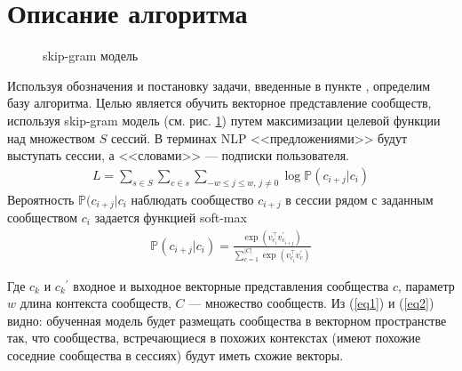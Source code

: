\documentclass[times,specification,annotation]{itmo-student-thesis}
\begin{document}
\section{Описание алгоритма}\label{sec:algo}

\begin{figure}[!h]
\caption{skip-gram модель}\label{fig-sg}
\centering
{}
\end{figure}

Используя обозначения и постановку задачи, введенные в пункте \label{sec:intro}, определим базу алгоритма. Целью является обучить векторное представление сообществ, используя skip-gram \cite{mikolov2013distributed} модель (см.  рис. \ref{fig-sg}) путем максимизации целевой функции над множеством $S$ сессий. В терминах NLP <<предложениями>> будут выступать сессии, а <<словами>> --- подписки пользователя.
\begin{align}
L = \sum_{s \in S}\sum_{c \in s}\sum_{-w \leq j \leq w,\, j \ne 0}\log \mathbb{P}(c_{i + j} | c_i) \label{eq1}
\end{align}
Вероятность $\mathbb{P}(c_{i + j} | c_i$ наблюдать сообщество $c_{i + j}$ в сессии рядом с заданным сообществом $c_i$ задается функцией soft-max 
\begin{align}
\mathbb{P}(c_{i + j} | c_i) = \frac{\exp(v_{c_i}^\top v_{c_{i + j}}^{'})}{\sum_{c = 1}^{|C|}\exp(v_{c_i}^\top v_{c}^{'})}\label{eq2}
\end{align}

Где ${c_k}$ и ${c_k}^{'}$ входное и выходное векторные представления сообщества $c$, параметр $w$ длина контекста сообществ, $C$ --- множество сообществ. 
Из (\ref{eq1}) и (\ref{eq2}) видно: обученная модель будет размещать сообщества в векторном пространстве так, что сообщества, встречающиеся в похожих контекстах (имеют похожие соседние сообщества в сессиях) будут иметь схожие векторы.  
\end{document}
